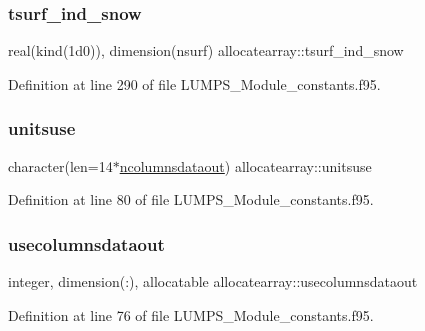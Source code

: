 \mbox{\label{namespaceallocatearray_a7594c0064ddb78e02668b1562fc0a06d}} 
\subsubsection{\texorpdfstring{tsurf\+\_\+ind\+\_\+snow}{tsurf\_ind\_snow}}
{\footnotesize\ttfamily real(kind(1d0)), dimension(nsurf) allocatearray\+::tsurf\+\_\+ind\+\_\+snow}



Definition at line 290 of file L\+U\+M\+P\+S\+\_\+\+Module\+\_\+constants.\+f95.

\mbox{\label{namespaceallocatearray_aa6d822a82ea3e0af76f519705a452b0e}} 
\subsubsection{\texorpdfstring{unitsuse}{unitsuse}}
{\footnotesize\ttfamily character(len=14$\ast$\hyperlink{namespaceallocatearray_a9408900bed6c87ed095d2c688c1506a0}{ncolumnsdataout}) allocatearray\+::unitsuse}



Definition at line 80 of file L\+U\+M\+P\+S\+\_\+\+Module\+\_\+constants.\+f95.

\mbox{\label{namespaceallocatearray_a66aee2b0878cf1d1cc5502cef18967b4}} 
\subsubsection{\texorpdfstring{usecolumnsdataout}{usecolumnsdataout}}
{\footnotesize\ttfamily integer, dimension(\+:), allocatable allocatearray\+::usecolumnsdataout}



Definition at line 76 of file L\+U\+M\+P\+S\+\_\+\+Module\+\_\+constants.\+f95.

\mbox{\label{namespaceallocatearray_ae6d924183e0a7e4015250d825d997423}} 
